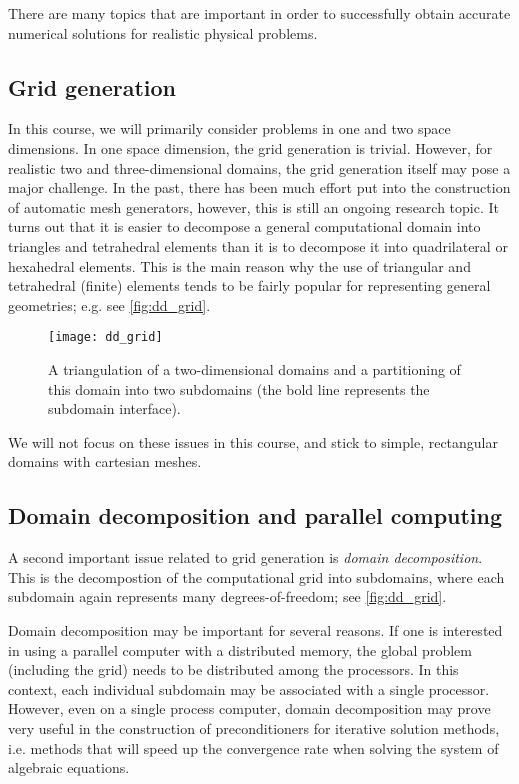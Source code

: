 There are many topics that are important in order to successfully obtain
accurate numerical solutions for realistic physical problems.

\subsection{Grid generation}

In this course, we will primarily consider problems in one and two space
dimensions. In one space dimension, the grid generation is trivial. However, for
realistic two and three-dimensional domains, the grid generation itself may pose
a major challenge. In the past, there has been much effort put into the
construction of automatic mesh generators, however, this is still an ongoing
research topic. It turns out that it is easier to decompose a general
computational domain into triangles and tetrahedral elements than it is to
decompose it into quadrilateral or hexahedral elements. This is the main reason
why the use of triangular and tetrahedral (finite) elements tends to be fairly
popular for representing general geometries; e.g. see \autoref{fig:dd_grid}.

\begin{figure}[htbp]
  \begin{center}
    \texttt{[image: dd\_grid]}
  \end{center}
  \caption{
    A triangulation of a two-dimensional domains and a partitioning of this
    domain into two subdomains (the bold line represents the subdomain
    interface).
  }
  \label{fig:dd_grid}
\end{figure}

We will not focus on these issues in this course, and stick to simple,
rectangular domains with cartesian meshes.

\subsection{Domain decomposition and parallel computing}

A second important issue related to grid generation is \emph{domain
decomposition}. This is the decompostion of the computational grid into
subdomains, where each subdomain again represents many degrees-of-freedom; see
\autoref{fig:dd_grid}.

Domain decomposition may be important for several reasons. If one is interested
in using a parallel computer with a distributed memory, the global problem
(including the grid) needs to be distributed among the processors. In this
context, each individual subdomain may be associated with a single processor.
However, even on a single process computer, domain decomposition may prove very
useful in the construction of preconditioners for iterative solution methods,
i.e. methods that will speed up the convergence rate when solving the system of
algebraic equations.


